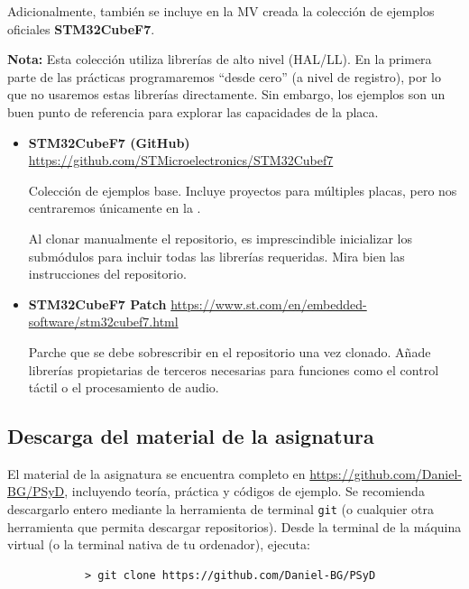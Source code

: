 \documentclass[../main.tex]{subfiles}
\begin{document}
        Adicionalmente, también se incluye en la MV creada la colección de ejemplos oficiales \textbf{STM32CubeF7}.

        \textbf{Nota:} Esta colección utiliza librerías de alto nivel (HAL/LL). En la primera parte de las prácticas programaremos ``desde cero'' (a nivel de registro), por lo que no usaremos estas librerías directamente. Sin embargo, los ejemplos son un buen punto de referencia para explorar las capacidades de la placa.

        \begin{itemize}
            \item \textbf{STM32CubeF7 (GitHub)} \url{https://github.com/STMicroelectronics/STM32Cubef7}
                    
                Colección de ejemplos base. Incluye proyectos para múltiples placas, pero nos centraremos únicamente en la \BOARD. 

                Al clonar manualmente el repositorio, es imprescindible inicializar los submódulos para incluir todas las librerías requeridas. Mira bien las instrucciones del repositorio.

            \item \textbf{STM32CubeF7 Patch} \url{https://www.st.com/en/embedded-software/stm32cubef7.html}

                Parche que se debe sobrescribir en el repositorio una vez clonado. Añade librerías propietarias de terceros necesarias para funciones como el control táctil o el procesamiento de audio.
        \end{itemize}

    \subsection{Descarga del material de la asignatura}\label{sub:download}

        El material de la asignatura se encuentra completo en \url{https://github.com/Daniel-BG/PSyD}, incluyendo teoría, práctica y códigos de ejemplo. Se recomienda descargarlo entero mediante la herramienta de terminal \texttt{git} (o cualquier otra herramienta que permita descargar repositorios). Desde la terminal de la máquina virtual (o la terminal nativa de tu ordenador), ejecuta:

        \begin{lstlisting}
            > git clone https://github.com/Daniel-BG/PSyD
        \end{lstlisting}
\end{document}
